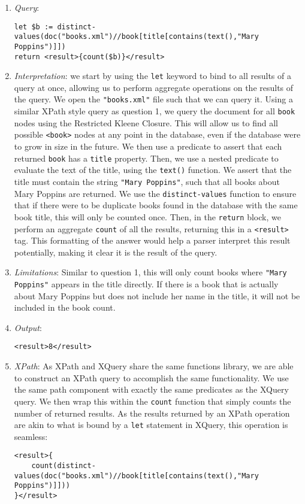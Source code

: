 \documentclass[11pt]{article}
\begin{document}
\begin{enumerate}
\item \textit{Query}:
\begin{small}
\begin{verbatim}
let $b := distinct-values(doc("books.xml")//book[title[contains(text(),"Mary Poppins")]])
return <result>{count($b)}</result>
\end{verbatim}
\end{small}
\item \textit{Interpretation}: we start by using the \texttt{let} keyword to bind to all results of a query at once, allowing us to perform aggregate operations on the results of the query. We open the \texttt{"books.xml"} file such that we can query it. Using a similar XPath style query as question 1, we query the document for all \texttt{book} nodes using the Restricted Kleene Closure. This will allow us to find all possible \texttt{<book>} nodes at any point in the database, even if the database were to grow in size in the future. We then use a predicate to assert that each returned \texttt{book} has a \texttt{title} property. Then, we use a nested predicate to evaluate the text of the title, using the \texttt{text()} function. We assert that the title must contain the string \texttt{"Mary Poppins"}, such that all books about Mary Poppins are returned. We use the \texttt{distinct-values} function to ensure that if there were to be duplicate books found in the database with the same book title, this will only be counted once. Then, in the \texttt{return} block, we perform an aggregate \texttt{count} of all the results, returning this in a \texttt{<result>} tag. This formatting of the answer would help a parser interpret this result potentially, making it clear it is the result of the query.

\item \textit{Limitations}: Similar to question 1, this will only count books where \texttt{"Mary Poppins"} appears in the title directly. If there is a book that is actually about Mary Poppins but does not include her name in the title, it will not be included in the book count.

\item \textit{Output}:
\begin{verbatim}
<result>8</result>
\end{verbatim} 
\item \textit{XPath}: As XPath and XQuery share the same functions library, we are able to construct an XPath query to accomplish the same functionality. We use the same path component with exactly the same predicates as the XQuery query. We then wrap this within the \texttt{count} function that simply counts the number of returned results. As the results returned by an XPath operation are akin to what is bound by a \texttt{let} statement in XQuery, this operation is seamless:
\begin{verbatim}
<result>{
    count(distinct-values(doc("books.xml")//book[title[contains(text(),"Mary Poppins")]]))
}</result>
\end{verbatim}
\end{enumerate}
\end{document}
